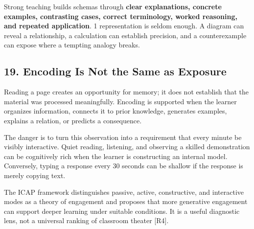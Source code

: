 Strong teaching builds schemas through \textbf{clear explanations, concrete examples, contrasting cases, correct terminology, worked reasoning, and repeated application}. 1 representation is seldom enough. A diagram can reveal a relationship, a calculation can establish precision, and a counterexample can expose where a tempting analogy breaks.

\subsection*{19. Encoding Is Not the Same as Exposure}

Reading a page creates an opportunity for memory; it does not establish that the material was processed meaningfully. Encoding is supported when the learner organizes information, connects it to prior knowledge, generates examples, explains a relation, or predicts a consequence.

The danger is to turn this observation into a requirement that every minute be visibly interactive. Quiet reading, listening, and observing a skilled demonstration can be cognitively rich when the learner is constructing an internal model. Conversely, typing a response every 30 seconds can be shallow if the response is merely copying text.

The ICAP framework distinguishes passive, active, constructive, and interactive modes as a theory of engagement and proposes that more generative engagement can support deeper learning under suitable conditions. It is a useful diagnostic lens, not a universal ranking of classroom theater [R4].

